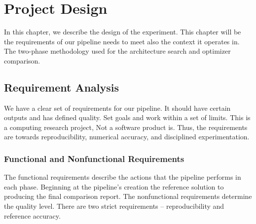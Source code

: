 \chapter{Project Design}

In this chapter, we describe the design of the experiment. This chapter will be the
requirements of our pipeline needs to meet also the context it operates in. The two-phase
methodology used for the architecture search and optimizer comparison.


\section{Requirement Analysis}

We have a clear set of requirements for our pipeline. It should have certain outputs and has defined quality.
Set goals and work within a set of limits. This is a computing research project,
Not a software product is. Thus, the requirements are towards reproducibility, numerical accuracy,
and disciplined experimentation.

\subsection{Functional and Nonfunctional Requirements}

The functional requirements describe the actions that the pipeline performs in each phase. Beginning at the pipeline's creation
the reference solution to producing the final comparison report. The nonfunctional requirements determine the quality level. There are two strict requirements – reproducibility and reference accuracy.

